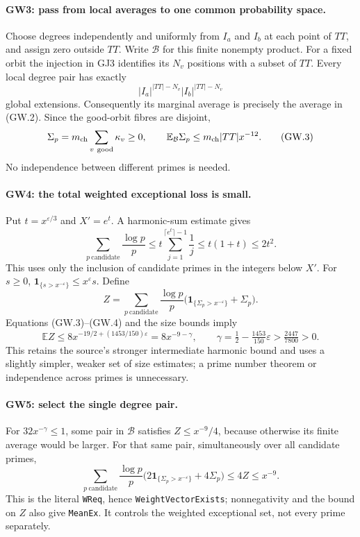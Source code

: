 \documentclass[11pt,a4paper]{article}
\numberwithin{equation}{section}
\theoremstyle{remark}\newtheorem{remark}[theorem]{Remark}
\begin{document}
\paragraph{GW3: pass from local averages to one common probability space.}
Choose degrees independently and uniformly from $I_a$ and $I_b$ at
each point of $TT$, and assign zero outside $TT$. Write $\mathcal B$
for this finite nonempty product. For a fixed orbit the injection in
GJ3 identifies its $N_v$ positions with a subset of $TT$. Every local
degree pair has exactly
\[
 |I_a|^{|TT|-N_v}|I_b|^{|TT|-N_v}
\]
global extensions. Consequently its marginal average is precisely
the average in (GW.2). Since the good-orbit fibres are disjoint,
\[
 \Sigma_p=m_{\rm ch}\sum_{v\ \mathrm{good}}\kappa_v\ge0,
 \qquad
 \mathbb E_{\mathcal B}\Sigma_p
 \le m_{\rm ch}|TT|x^{-12}.                         \tag{GW.3}
\]
No independence between different primes is needed.

\paragraph{GW4: the total weighted exceptional loss is small.}
Put $t=x^{\varepsilon/3}$ and $X'=e^t$. A harmonic-sum estimate gives
\[
 \sum_{p\ \mathrm{candidate}}\frac{\log p}{p}
 \le t\sum_{j=1}^{\lceil e^t\rceil-1}\frac1j
 \le t(1+t)\le2t^2.                                \tag{GW.4}
\]
This uses only the inclusion of candidate primes in the integers
below $X'$. For $s\ge0$,
$\mathbf1_{\{s>x^{-\varepsilon}\}}\le x^\varepsilon s$.
Define
\[
 Z=\sum_{p\ \mathrm{candidate}}\frac{\log p}{p}
   \bigl(\mathbf1_{\{\Sigma_p>x^{-\varepsilon}\}}+\Sigma_p\bigr).
\]
Equations (GW.3)--(GW.4) and the size bounds imply
\[
 \mathbb E Z
 \le8x^{-19/2+(1453/150)\varepsilon}
 =8x^{-9-\gamma},\qquad
 \gamma=\tfrac12-\tfrac{1453}{150}\varepsilon
 >\tfrac{2447}{7800}>0.                            \tag{GW.5}
\]
This retains the source's stronger intermediate harmonic bound and
uses a slightly simpler, weaker set of size estimates; a prime number
theorem or independence across primes is unnecessary.

\paragraph{GW5: select the single degree pair.}
For $32x^{-\gamma}\le1$, some pair in $\mathcal B$ satisfies
$Z\le x^{-9}/4$, because otherwise its finite average would be larger.
For that same pair, simultaneously over all candidate primes,
\[
 \boxed{\quad
 \sum_{p\ \mathrm{candidate}}\frac{\log p}{p}
  \bigl(2\mathbf1_{\{\Sigma_p>x^{-\varepsilon}\}}+4\Sigma_p\bigr)
 \le4Z\le x^{-9}.
 \quad}                                                   \tag{GW.6}
\]
This is the literal \texttt{WReq}, hence \texttt{WeightVectorExists};
nonnegativity and the bound on $Z$ also give \texttt{MeanEx}.
It controls the weighted exceptional set, not every prime separately.
\end{document}
